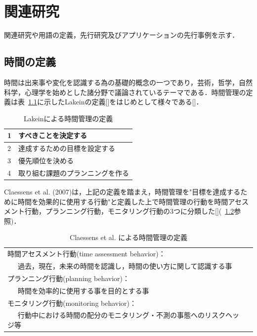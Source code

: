 \chapter{関連研究}
関連研究や用語の定義，先行研究及びアプリケーションの先行事例を示す．

\section{時間の定義}
時間は出来事や変化を認識する為の基礎的概念の一つであり，芸術，哲学，自然科学，心理学を始めとした諸分野で議論されているテーマである．時間管理の定義は表~\ref{tb:Lakein}に示したLakeinの定義[]をはじめとして様々である[]．

\begin{table}[htb]
\begin{center}
  \begin{tabular}{|l|l|} \hline
   1 & すべきことを決定する \\ \hline
   2 & 達成するための目標を設定する \\ \hline
   3 & 優先順位を決める \\ \hline
   4 & 取り組む課題のプランニングを作る \\ \hline
  \end{tabular}
  \caption{Lakeinによる時間管理の定義}
  \label{tb:Lakein}
\end{center}
\end{table}

Claessens et al. (2007)は，上記の定義を踏まえ，時間管理を"目標を達成するために時間を効果的に使用する行動"と定義した上で時間管理の行動を時間アセスメント行動，プランニング行動，モニタリング行動の3つに分類した[](~\ref{tb:Claessens}参照)．

\begin{table}[htb]
\begin{center}
  \begin{tabular}{|l|l|} \hline
   時間アセスメント行動(time assessment behavior)： \\ ~~~過去，現在，未来の時間を認識し，時間の使い方に関して認識する事 \\ \hline
   プランニング行動(planning behavior)：　\\  ~~~時間を効率的に使用する事を目的とする事 \\ \hline
   モニタリング行動(monitoring behavior)： \\ ~~~行動中における時間の配分のモニタリング・不測の事態へのリスクヘッジ等 \\ \hline
  \end{tabular}
  \caption{Claessens et al. による時間管理の定義}
  \label{tb:Claessens}
\end{center}
\end{table}

